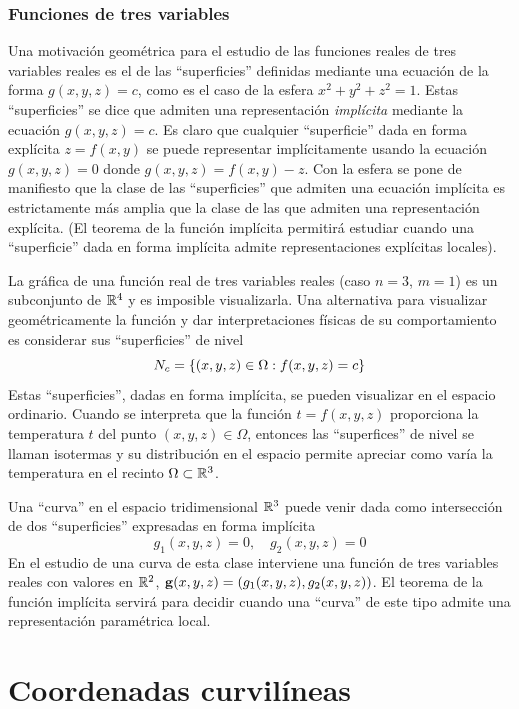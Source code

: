 \subsubsection*{Funciones de tres variables}

Una motivación geométrica para el estudio de las funciones reales de tres variables reales es el de las ``superficies'' definidas mediante una ecuación de la forma $g(x,y,z)=c$, como es el caso de la esfera $x^2+y^2+z^2=1$. Estas ``superficies'' se dice que admiten una representación {\it implícita} mediante la ecuación $g(x,y,z)=c$. Es claro que cualquier ``superficie'' dada en forma explícita $z=f(x,y)$ se puede representar implícitamente usando la ecuación $g(x,y,z)=0$ donde $g(x,y,z)=f(x,y)-z$. Con la esfera se pone de manifiesto que la clase de las ``superficies'' que admiten una ecuación implícita es estrictamente más amplia que la clase de las que admiten una representación explícita. (El teorema de la función implícita permitirá estudiar cuando una ``superficie'' dada en forma implícita admite representaciones explícitas locales).

La gráfica de una función real de tres variables reales (caso $n=3$, $m=1$) es un subconjunto de $\mathbb{R}^4$ y es imposible visualizarla. Una alternativa para visualizar geométricamente la función y dar interpretaciones físicas de su comportamiento es considerar sus ``superficies'' de nivel
$$N_c=\left\lbrace (x,y,z)\in\Omega : f(x,y,z)=c\right\rbrace$$
Estas ``superficies'', dadas en  forma implícita, se pueden visualizar en el espacio ordinario. Cuando se interpreta que la función $t=f(x,y,z)$ proporciona la temperatura $t$ del punto $(x,y,z)\in\Omega$, entonces las ``superfices'' de nivel se llaman isotermas y su distribución en el espacio permite apreciar como varía la temperatura en el recinto $\Omega\subset\mathbb{R}^3$.

Una ``curva'' en el espacio tridimensional $\mathbb{R}^3$ puede venir dada como intersección de dos ``superficies'' expresadas en forma implícita
$$g_1(x,y,z)=0, \quad g_2(x,y,z)=0$$
En el estudio de una curva de esta clase interviene una función de tres variables reales con valores en $\mathbb{R}^2$, $\mathbf{g}(x,y,z)=(g_1(x,y,z), g_2(x,y,z))$. El teorema de la función implícita servirá para decidir cuando una ``curva'' de este tipo admite una representación paramétrica local.

\section{Coordenadas curvilíneas}

